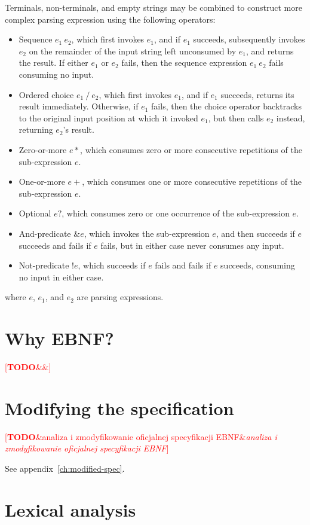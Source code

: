 \documentclass[english,engineering]{wizthesis}
\newcommand{\todo}[1]{%
  \textcolor{red}{[\textbf{TODO}\ifx&#1&{}\else{ }\fi\emph{#1}]}%
}
\begin{document}
Terminals, non-terminals, and empty strings may be combined to construct more
complex parsing expression using the following operators:
\begin{itemize}[noitemsep]
  \item Sequence $e_1\ e_2$, which first invokes $e_1$, and if $e_1$ succeeds,
  subsequently invokes $e_2$ on the remainder of the input string left
  unconsumed by $e_1$, and returns the result. If either $e_1$ or $e_2$ fails,
  then the sequence expression $e_1\ e_2$ fails consuming no input.
  \item Ordered choice $e_1\ /\ e_2$, which first invokes $e_1$, and if $e_1$
  succeeds, returns its result immediately. Otherwise, if $e_1$ fails, then the
  choice operator backtracks to the original input position at which it invoked
  $e_1$, but then calls $e_2$ instead, returning $e_2$'s result.
  \item Zero-or-more $e*$, which consumes zero or more consecutive repetitions
  of the sub-expression $e$.
  \item One-or-more $e+$, which consumes one or more consecutive repetitions of
  the sub-expression $e$.
  \item Optional $e?$, which consumes zero or one occurrence of the
  sub-expression $e$.
  \item And-predicate $\&e$, which invokes the sub-expression $e$, and then
  succeeds if $e$ succeeds and fails if $e$ fails, but in either case never
  consumes any input.
  \item Not-predicate $!e$, which succeeds if $e$ fails and fails if $e$
  succeeds, consuming no input in either case.
\end{itemize}
where $e$, $e_1$, and $e_2$ are parsing expressions. 

\section{Why EBNF?} \label{sec:why-ebnf}

\todo{}

\section{Modifying the specification} \label{sec:modified-specification}

\todo{analiza i zmodyfikowanie oficjalnej specyfikacji EBNF}

See appendix~\ref{ch:modified-spec}.

\section{Lexical analysis} \label{sec:lexing}
\end{document}
